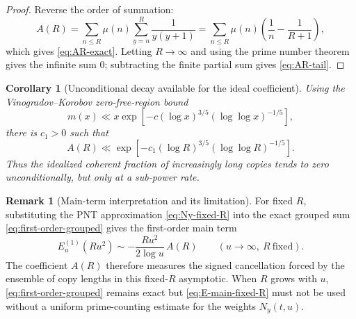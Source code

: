 \documentclass[11pt,reqno]{amsart}
\theoremstyle{plain}
\newtheorem{corollary}[theorem]{Corollary}
\theoremstyle{definition}
\newtheorem{remark}[theorem]{Remark}
\begin{document}
\begin{proof}
Reverse the order of summation:
\[
  A(R)
  =\sum_{n\le R}\mu(n)
    \sum_{y=n}^{R}\frac1{y(y+1)}
  =\sum_{n\le R}\mu(n)
    \left(\frac1n-\frac1{R+1}\right),
\]
which gives \eqref{eq:AR-exact}.  Letting $R\to\infty$ and using the prime
number theorem gives the infinite sum $0$; subtracting the finite partial
sum gives \eqref{eq:AR-tail}.
\end{proof}

\begin{corollary}[Unconditional decay available for the ideal coefficient]
\label{cor:AR-VK}
Using the Vinogradov--Korobov zero-free-region bound
\[
  m(x)\ll
  x\exp\!\left[-c(\log x)^{3/5}(\log\log x)^{-1/5}\right],
\]
there is $c_1>0$ such that
\begin{equation}
\label{eq:AR-VK}
  A(R)\ll
  \exp\!\left[-c_1(\log R)^{3/5}(\log\log R)^{-1/5}\right].
\end{equation}
Thus the idealized coherent fraction of increasingly long copies tends to
zero unconditionally, but only at a sub-power rate.
\end{corollary}

\begin{remark}[Main-term interpretation and its limitation]
\label{rem:AR-main-term}
For fixed $R$, substituting the PNT approximation
\eqref{eq:Ny-fixed-R} into the exact grouped sum
\eqref{eq:first-order-grouped} gives the first-order main term
\begin{equation}
\label{eq:E-main-fixed-R}
  E_u^{(1)}(Ru^2)
  \sim -\frac{Ru^2}{2\log u}\,A(R)
  \qquad(u\to\infty,\ R\ \text{fixed}).
\end{equation}
The coefficient $A(R)$ therefore measures the signed cancellation forced by
the ensemble of copy lengths in this fixed-$R$ asymptotic.  When $R$ grows
with $u$, \eqref{eq:first-order-grouped} remains exact but
\eqref{eq:E-main-fixed-R} must not be used without a uniform prime-counting
estimate for the weights $N_y(t,u)$.
\end{remark}
\end{document}
